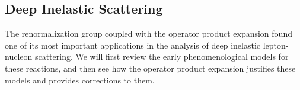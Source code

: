 
\subsection{Deep Inelastic Scattering}

The renormalization group coupled with the operator product expansion found one of its most important applications in the analysis of deep inelastic lepton-nucleon scattering. We will first review the early phenomenological models for these reactions, and then see how the operator product expansion justifies these models and provides corrections to them.

